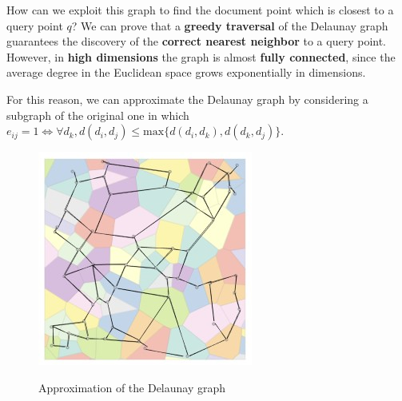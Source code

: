 How can we exploit this graph to find the document point which is closest to a query point $q$? We can prove that a \textbf{greedy traversal} of the Delaunay graph guarantees the discovery of the \textbf{correct nearest neighbor} to a query point. However, in \textbf{high dimensions} the graph is almost \textbf{fully connected}, since the average degree in the Euclidean space grows exponentially in dimensions.

For this reason, we can approximate the Delaunay graph by considering a subgraph of the original one in which $e_{ij} = 1 \iff \forall d_k, d(d_i, d_j) \leq \text{max} \{ d(d_i, d_k), d(d_k, d_j) \}$. 

\begin{figure}[h!]
		\centering
		\includegraphics[scale = 1.8]{img/graph_3.jpg}
        \label{graph3}
        \caption{Approximation of the Delaunay graph}
\end{figure}
